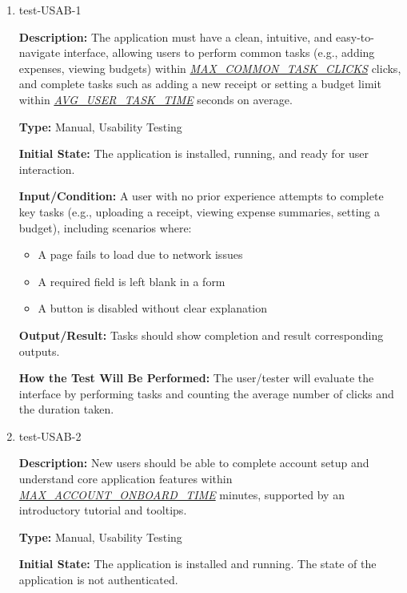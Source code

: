 \documentclass[12pt, titlepage]{article}
\begin{document}
\begin{enumerate}

\item{test-USAB-1\\}

\textbf{Description:} The application must have a clean, intuitive, and
easy-to-navigate interface, allowing users to perform common tasks (e.g., adding
expenses, viewing budgets) within
\href{https://github.com/PlutosCapstone/Plutos/blob/main/docs/SRS/SRS.pdf}{\textit{MAX\_COMMON\_TASK\_CLICKS}}
clicks, and complete tasks such as adding a new receipt or setting a budget
limit within
\href{https://github.com/PlutosCapstone/Plutos/blob/main/docs/SRS/SRS.pdf}{\textit{AVG\_USER\_TASK\_TIME}}
seconds on average.

\textbf{Type:} Manual, Usability Testing
					
\textbf{Initial State:} The application is installed, running, and ready for user interaction.
					
\textbf{Input/Condition:} A user with no prior experience attempts to complete key tasks (e.g., uploading a receipt, viewing expense summaries, setting a budget), 
including scenarios where:
  \begin{itemize}
      \item A page fails to load due to network issues
      \item A required field is left blank in a form
      \item A button is disabled without clear explanation
  \end{itemize}
					
\textbf{Output/Result:} Tasks should show completion and result corresponding
outputs.
					
\textbf{How the Test Will Be Performed:} The user/tester will evaluate the
interface by performing tasks and counting the average number of clicks and the
duration taken.

\item{test-USAB-2\\}

\textbf{Description:} New users should be able to complete account setup and
understand core application features within
\href{https://github.com/PlutosCapstone/Plutos/blob/main/docs/SRS/SRS.pdf}{\textit{MAX\_ACCOUNT\_ONBOARD\_TIME}}
minutes, supported by an introductory tutorial and tooltips.

\textbf{Type:} Manual, Usability Testing
					
\textbf{Initial State:} The application is installed and running. The state of
the application is not authenticated.
					

\end{enumerate}
\end{document}

